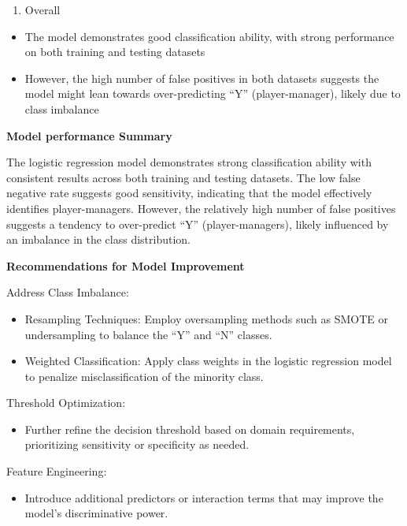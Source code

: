 \documentclass[
]{article}
\providecommand{\tightlist}{%
  \setlength{\itemsep}{0pt}\setlength{\parskip}{0pt}}
\begin{document}
\begin{enumerate}
\def\labelenumi{\arabic{enumi}.}
\setcounter{enumi}{2}
\tightlist
\item
  Overall
\end{enumerate}

\begin{itemize}
\item
  The model demonstrates good classification ability, with strong
  performance on both training and testing datasets
\item
  However, the high number of false positives in both datasets suggests
  the model might lean towards over-predicting ``Y'' (player-manager),
  likely due to class imbalance
\end{itemize}

\textbf{Model performance Summary}

The logistic regression model demonstrates strong classification ability
with consistent results across both training and testing datasets. The
low false negative rate suggests good sensitivity, indicating that the
model effectively identifies player-managers. However, the relatively
high number of false positives suggests a tendency to over-predict ``Y''
(player-managers), likely influenced by an imbalance in the class
distribution.

\textbf{Recommendations for Model Improvement}

Address Class Imbalance:

\begin{itemize}
\item
  Resampling Techniques: Employ oversampling methods such as SMOTE or
  undersampling to balance the ``Y'' and ``N'' classes.
\item
  Weighted Classification: Apply class weights in the logistic
  regression model to penalize misclassification of the minority class.
\end{itemize}

Threshold Optimization:

\begin{itemize}
\tightlist
\item
  Further refine the decision threshold based on domain requirements,
  prioritizing sensitivity or specificity as needed.
\end{itemize}

Feature Engineering:

\begin{itemize}
\tightlist
\item
  Introduce additional predictors or interaction terms that may improve
  the model's discriminative power.
\end{itemize}
\end{document}
